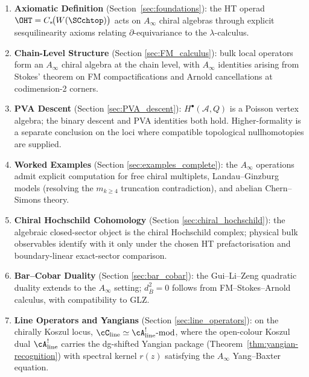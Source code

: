 \begin{enumerate}[label=(\Roman*)]
\item \textbf{Axiomatic Definition} (Section~\ref{sec:foundations}): the HT operad $\OHT=C_\ast\!\bigl(W(\SCchtop)\bigr)$ acts on $A_\infty$ chiral algebras through explicit sesquilinearity axioms relating $\partial$-equivariance to the $\lambda$-calculus.

\item \textbf{Chain-Level Structure} (Section \ref{sec:FM_calculus}): bulk local operators form an $A_\infty$ chiral algebra at the chain level, with $A_\infty$ identities arising from Stokes' theorem on FM compactifications and Arnold cancellations at codimension-2 corners.

\item \textbf{PVA Descent} (Section \ref{sec:PVA_descent}): $H^\bullet(\mathcal{A}, Q)$ is a Poisson vertex algebra; the binary descent and PVA identities both hold. Higher-formality is a separate conclusion on the loci where compatible topological nullhomotopies are supplied.

\item \textbf{Worked Examples} (Section \ref{sec:examples_complete}): the $A_\infty$ operations admit explicit computation for free chiral multiplets, Landau--Ginzburg models (resolving the $m_{k \geq 4}$ truncation contradiction), and abelian Chern--Simons theory.

\item \textbf{Chiral Hochschild Cohomology} (Section \ref{sec:chiral_hochschild}): the algebraic closed-sector object is the chiral Hochschild complex; physical bulk observables identify with it only under the chosen HT prefactorisation and boundary-linear exact-sector comparison.

\item \textbf{Bar--Cobar Duality} (Section \ref{sec:bar_cobar}): the Gui--Li--Zeng quadratic duality extends to the $A_\infty$ setting; $d_{\overline{B}}^2 = 0$ follows from FM--Stokes--Arnold calculus, with compatibility to GLZ.

\item \textbf{Line Operators and Yangians} (Section \ref{sec:line_operators}): on the chirally Koszul locus, $\cC_{\mathrm{line}} \simeq \cA^!_{\mathrm{line}}\text{-mod}$, where the open-colour Koszul dual $\cA^!_{\mathrm{line}}$ carries the dg-shifted Yangian package (Theorem~\ref{thm:yangian-recognition}) with spectral kernel $r(z)$ satisfying the $A_\infty$ Yang--Baxter equation.
\end{enumerate}

